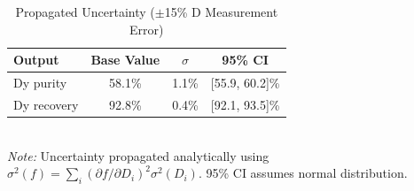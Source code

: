 \begin{table}[htbp]
\centering
\caption{Propagated Uncertainty ($\pm$15\% D Measurement Error)}
\label{tab:uncertainty}
\begin{tabular}{lccc}
\toprule
Output & Base Value & $\sigma$ & 95\% CI \\
\midrule
Dy purity & 58.1\% & 1.1\% & [55.9, 60.2]\% \\
Dy recovery & 92.8\% & 0.4\% & [92.1, 93.5]\% \\
\bottomrule
\end{tabular}
\\[0.5em]
\footnotesize{\textit{Note:} Uncertainty propagated analytically using $\sigma^2(f) = \sum_i (\partial f/\partial D_i)^2 \sigma^2(D_i)$. 95\% CI assumes normal distribution.}
\end{table}